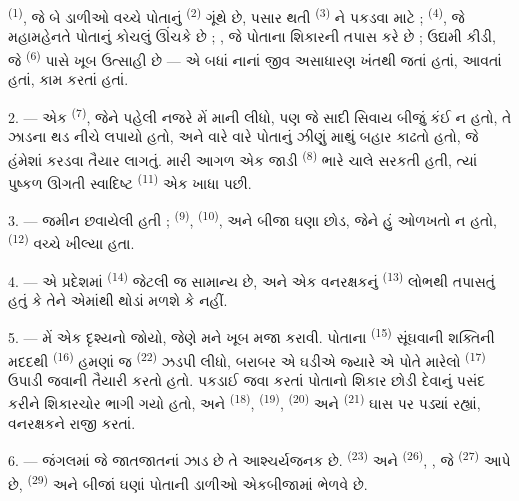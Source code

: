  \textsuperscript{(1)}, જે બે ડાળીઓ વચ્ચે પોતાનું
 \textsuperscript{(2)} ગૂંથે છે, પસાર થતી 
\textsuperscript{(3)} ને પકડવા માટે ; 
\textsuperscript{(4)}, જે મહામહેનતે પોતાનું કોચલું ઊંચકે છે ;
, જે પોતાના શિકારની તપાસ કરે છે ; ઉદ્યમી કીડી,
જે  \textsuperscript{(6)} પાસે ખૂબ ઉત્સાહી છે — એ બધાં
નાનાં જીવ અસાધારણ ખંતથી જતાં હતાં, આવતાં હતાં, કામ કરતાં હતાં.

2. --- એક  \textsuperscript{(7)}, જેને પહેલી નજરે મેં
 માની લીધો, પણ જે સાદી  સિવાય બીજું કંઈ ન
હતો, તે ઝાડના થડ નીચે લપાયો હતો, અને વારે વારે પોતાનું ઝીણું માથું
બહાર કાઢતો હતો, જે હંમેશાં કરડવા તૈયાર લાગતું. મારી આગળ એક જાડી
 \textsuperscript{(8)} ભારે ચાલે સરકતી હતી,
ત્યાં પુષ્કળ ઊગતી સ્વાદિષ્ટ 
\textsuperscript{(11)} એક ખાધા પછી.

3. --- જમીન  છવાયેલી હતી ; 
\textsuperscript{(9)},  \textsuperscript{(10)}, અને
બીજા ઘણા છોડ, જેને હું ઓળખતો ન હતો, 
\textsuperscript{(12)} વચ્ચે ખીલ્યા હતા.

4. --- એ પ્રદેશમાં  
\textsuperscript{(14)} જેટલી જ સામાન્ય છે, અને એક વનરક્ષકનું
 \textsuperscript{(13)} લોભથી તપાસતું હતું કે
તેને એમાંથી થોડાં મળશે કે નહીં.

\VUsaut{3.0mm}
\VUsaut{3.0mm}

5. --- મેં એક દૃશ્યનો  જોયો, જેણે મને ખૂબ મજા કરાવી.
પોતાના  \textsuperscript{(15)} સૂંઘવાની શક્તિની
મદદથી  \textsuperscript{(16)} હમણાં જ
 \textsuperscript{(22)} ઝડપી લીધો, બરાબર એ ઘડીએ
જ્યારે એ પોતે મારેલો  \textsuperscript{(17)} ઉપાડી જવાની
તૈયારી કરતો હતો. પકડાઈ જવા કરતાં પોતાનો શિકાર છોડી દેવાનું પસંદ કરીને
શિકારચોર ભાગી ગયો હતો, અને  \textsuperscript{(18)},
 \textsuperscript{(19)}, 
\textsuperscript{(20)} અને  \textsuperscript{(21)}
ઘાસ પર પડ્યાં રહ્યાં, વનરક્ષકને રાજી કરતાં.

6. --- જંગલમાં જે જાતજાતનાં ઝાડ છે તે આશ્ચર્યજનક છે. 
\textsuperscript{(23)} અને  \textsuperscript{(26)},
, જે  \textsuperscript{(27)} આપે છે,
 \textsuperscript{(29)} અને બીજાં ઘણાં પોતાની ડાળીઓ
એકબીજામાં ભેળવે છે.

